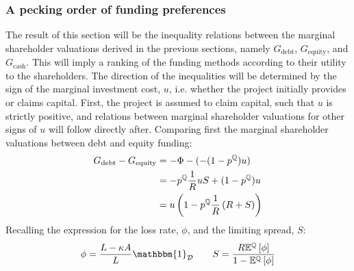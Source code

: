 \documentclass[../main.tex]{subfiles}
\begin{document}
    \subsubsection{A pecking order of funding preferences}
        The result of this section will be the inequality relations between the marginal shareholder valuations
        derived in the previous sections, namely $G_{\text{debt}}$, $G_{\text{equity}}$, and $G_{\text{cash}}$.
        This will imply a ranking of the funding methods according to their utility to the shareholders.
        The direction of the inequalities will be determined by the sign of the marginal investment cost, $u$,
        i.e. whether the project initially provides or claims capital. 
        First, the project is assumed to claim capital, such that $u$ is strictly positive,
        and relations between marginal shareholder valuations for other signs of $u$ will follow directly after.
        Comparing first the marginal shareholder valuations between debt and equity funding:
            \begin{align}
                G_{\text{debt}}
                -
                G_{\text{equity}}
                &=
                    - \Phi 
                    - 
                    (
                        - (1 - p^{\mathbb{Q}})
                        u
                    )
                    \nonumber \\
                &= 
                    - p^{\mathbb{Q}}
                    \frac{1}{R}
                    u
                    S
                    +
                    (1 - p^{\mathbb{Q}})
                    u
                    \nonumber \\
                &=
                    u \left(
                        1
                        -
                        p^{\mathbb{Q}}
                        \frac{1}{R}
                        \left(
                            R
                            +
                            S
                        \right)
                    \right)
                \label{eqn:G-debt-vs-G-equity-step-1}
            \end{align}
        Recalling the expression for the loss rate, $\phi$, and the limiting spread, $S$:
            \begin{equation*}
                \phi 
                = 
                    \frac{
                        L - \kappa A
                    }{
                        L
                    } 
                    \mathbbm{1}_{\mathcal{D}}
                \qquad
                S 
                = 
                    \frac{
                        \grossrfrate
                        \mathbb{E}^{\rnmeasure}\left[\phi\right]
                    }{
                        1
                        -
                        \mathbb{E}^{\rnmeasure}\left[\phi\right]  
                    } 
            \end{equation*}
\end{document}
